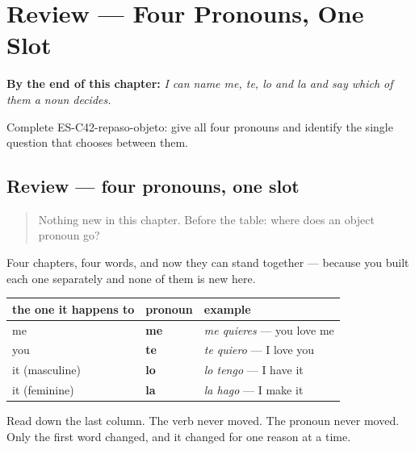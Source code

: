 
\chapter{Review --- Four Pronouns, One Slot}
\label{ch:review-direct-object}

\begin{chapteropening}
\textbf{By the end of this chapter:} \emph{I can name me, te, lo and la and say which of them a noun decides.}

Complete ES-C42-repaso-objeto: give all four pronouns and identify the single question that chooses between them.
\end{chapteropening}

\section[Practice]{Review — four pronouns, one slot}

\label{lesson:ES-C42-repaso-objeto}



\begin{quote}
Nothing new in this chapter. Before the table: where does an object pronoun go?
\end{quote}

\begin{grammarlens}[title={What you've built}]
Four chapters, four words, and now they can stand together — because you built each one separately and none of them is new here.

\noindent
\begin{tabularx}{\linewidth}{@{}>{\raggedright\arraybackslash}X>{\raggedright\arraybackslash}X>{\raggedright\arraybackslash}X@{}}
\toprule
\textbf{the one it happens to} & \textbf{pronoun} & \textbf{example} \\
\midrule
me & \textbf{me} & \emph{me quieres} — you love me \\
you & \textbf{te} & \emph{te quiero} — I love you \\
it (masculine) & \textbf{lo} & \emph{lo tengo} — I have it \\
it (feminine) & \textbf{la} & \emph{la hago} — I make it \\
\bottomrule
\end{tabularx}

Read down the last column. The verb never moved. The pronoun never moved. Only the first word changed, and it changed for one reason at a time.
\end{grammarlens}

